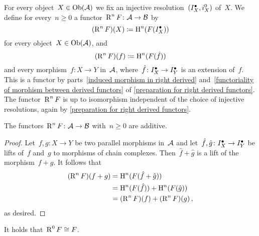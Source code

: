 \begin{remarkdefinition}
  For every object~$X \in \operatorname{Ob}(\mathcal{A})$ we fix an injective resolution~$(I^\bullet_X, i^0_X)$ of~$X$.
  We define for every~$n \geq 0$ a functor~$\operatorname{R}^n F \colon \mathcal{A} \to \mathcal{B}$ by
  \[
    (\operatorname{R}^n F)(X)
    \coloneqq
    \operatorname{H}^n( F(I^\bullet_X) )
  \]
  for every object~$X \in \operatorname{Ob}(\mathcal{A})$, and
  \[
    (\operatorname{R}^n F)(f)
    \coloneqq
    \operatorname{H}^n(F(\hat{f}))
  \]
   and every morphism~$f \colon X \to Y$ in~$\mathcal{A}$, where~$\hat{f} \colon I^\bullet_X \to I^\bullet_Y$ is an extension of~$f$.
  This is a {\welldef} functor by parts~\ref*{induced morphism in right derived} and~\ref*{functoriality of morphism between derived functors} of \cref{preparation for right derived functors}.
  The functor~$\operatorname{R}^n F$ is up to isomorphism independent of the choice of injective resolutions, again by \cref{preparation for right derived functors}.
\end{remarkdefinition}


\begin{lemma}
  The functors~$\operatorname{R}^n F \colon \mathcal{A} \to \mathcal{B}$ with~$n \geq 0$ are additive.
\end{lemma}


\begin{proof}
  Let~$f, g \colon X \to Y$ be two parallel morphisms in~$\mathcal{A}$ and let~$\hat{f}, \hat{g} \colon I^\bullet_X \to I^\bullet_Y$ be lifts of~$f$ and~$g$ to morphisms of chain complexes.
  Then~$\hat{f} + \hat{g}$ is a lift of the morphism~$f + g$.
  It follows that
  \begin{align*}
        (\operatorname{R}^n F)(f + g)
    &=  \operatorname{H}^n(F(\hat{f}+\hat{g})) \\
    &=  \operatorname{H}^n(F(\hat{f})) + \operatorname{H}^n(F(\hat{g})) \\
    &=  (\operatorname{R}^n F)(f) + (\operatorname{R}^n F)(g) \,,
  \end{align*}
  as desired.
\end{proof}


\begin{lemma}
  It holds that~$\operatorname{R}^0 F \cong F$.
\end{lemma}


